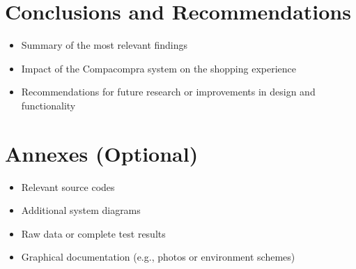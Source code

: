 \documentclass[a4paper,11pt]{article}
\begin{document}
\section{Conclusions and Recommendations}
\begin{itemize}
\item Summary of the most relevant findings
\item Impact of the Compacompra system on the shopping experience
\item Recommendations for future research or improvements in design and functionality
\end{itemize}

\section{Annexes (Optional)}
\begin{itemize}
\item Relevant source codes
\item Additional system diagrams
\item Raw data or complete test results
\item Graphical documentation (e.g., photos or environment schemes)
\end{itemize}

\printbibliography
\end{document}
